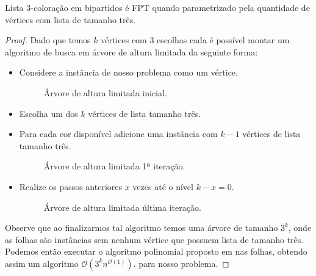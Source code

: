 \begin{teorema}
Lista 3-coloração em bipartidos é FPT quando parametrizado pela quantidade de vértices com lista de tamanho três.
\end{teorema}

\begin{proof}
Dado que temos $k$ vértices com 3 escolhas cada é possível montar um algoritmo de busca em árvore de altura limitada da seguinte forma:

\begin{itemize}
  \item Considere a instância de nosso problema como um vértice.
  \begin{figure}[H]
		\centering
		\fontsize{5}{10}
		
		\caption{Árvore de altura limitada inicial. }
\end{figure}

  \item Escolha um dos $k$ vértices de lista tamanho três.
  \item Para cada cor disponível adicione uma instância com $k-1$ vértices de lista tamanho três.
  \begin{figure}[H]
		\centering
		\fontsize{5}{10}
		
		\caption{Árvore de altura limitada 1ª iteração. }
\end{figure}

  \item Realize os passos anteriores $x$ vezes até o nível $k-x=0$.
  \begin{figure}[H]
		\centering
		\fontsize{5}{10}
		
		\caption{Árvore de altura limitada última iteração. }
\end{figure}
\end{itemize}
 
 Observe que ao finalizarmos tal algoritmo temos uma árvore de tamanho $3^k$, onde as folhas são instâncias sem nenhum vértice que possuem lista de tamanho três. 
 Podemos então executar o algoritmo polinomial proposto em \cite{hujter93} nas folhas, obtendo assim um algoritmo $\mathcal{O}(3^kn^{\mathcal{O}(1)})$. para nosso problema.
\end{proof}
